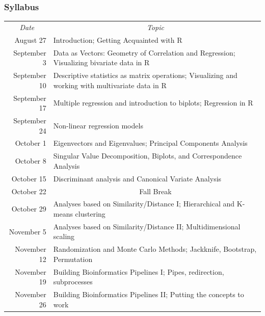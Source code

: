 \documentclass{beamer}
\begin{document}
\begin{frame}
  \frametitle{Syllabus}

\scriptsize

\renewcommand{\arraystretch}{1.1}
\begin{tabular}{rp{3.5in}}
\multicolumn{1}{c}{{\sl Date}} & \multicolumn{1}{c}{{\sl Topic}} \\
August 27 & Introduction; Getting Acquainted with R \\
September 3 & Data as Vectors: Geometry of Correlation and Regression; Visualizing bivariate data in R\\
September 10 & Descriptive statistics as matrix operations; Visualizing and working with multivariate data in R\\
September 17 & Multiple regression and introduction to biplots; Regression in R\\
September 24 & Non-linear regression models\\
October 1 & Eigenvectors and Eigenvalues; Principal Components Analysis \\
October 8 & Singular Value Decomposition, Biplots, and Correspondence Analysis\\
October 15 & Discriminant analysis and Canonical Variate Analysis\\
October 22 & \multicolumn{1}{c}{{\sc Fall Break}} \\
October 29 & Analyses based on Similarity/Distance I; Hierarchical and K-means clustering\\
November 5 & Analyses based on Similarity/Distance II; Multidimensional scaling\\
November 12 & Randomization and Monte Carlo Methods; Jackknife, Bootstrap, Permutation\\
November 19 & Building Bioinformatics Pipelines I; Pipes, redirection, subprocesses \\
November 26 & Building Bioinformatics Pipelines II; Putting the concepts to work \\


\end{tabular}

\normalsize

\end{frame}
\end{document}
